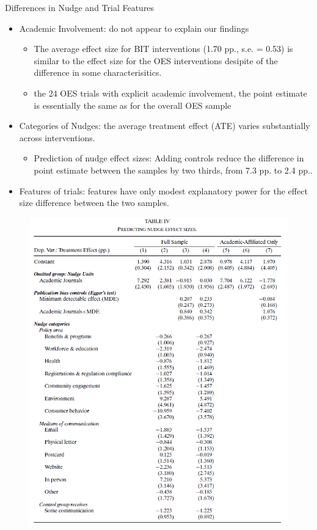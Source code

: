 \documentclass[dvipdfmx,11pt]{beamer}
\begin{document}
\begin{frame}{Differences in Nudge and Trial Features}
  \begin{itemize}
    \item Academic Involvement: do not appear to explain our findings
    \begin{itemize}
      \item The average effect size for BIT interventions (1.70 pp., s.e. = 0.53) is similar to the effect size for the OES interventions desipite of the difference in some characterisitics.
      \item the 24 OES trials with explicit academic involvement, the point estimate is essentially the same as for the overall OES sample
    \end{itemize}
    \item Categories of Nudges: the average treatment effect (ATE) varies substantially across interventions.
    \begin{itemize}
      \item Prediction of nudge effect sizes: Adding controls reduce the difference in point estimate between the samples by two thirds, from 7.3 pp. to 2.4 pp..
    \end{itemize}
    \item Features of trials: features have only modest explanatory power for the effect size difference between the two samples.
  \end{itemize}
\end{frame}

\begin{frame}{}
  \begin{figure}
    \centering
    \includegraphics[scale = .4]{fig_tab/os20220412/T4a.png}
  \end{figure}
\end{frame}
\end{document}

